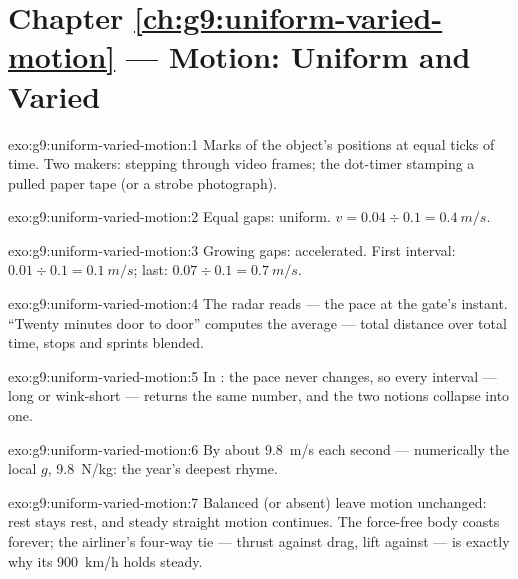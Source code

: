 \section*{Chapter \ref{ch:g9:uniform-varied-motion} --- Motion: Uniform and Varied}

\begin{solution}{exo:g9:uniform-varied-motion:1}
Marks of the object's positions at equal ticks of time. Two
makers: stepping through video frames; the dot-timer stamping
a pulled paper tape (or a strobe photograph).
\end{solution}

\begin{solution}{exo:g9:uniform-varied-motion:2}
Equal gaps: uniform. $v = 0.04 \div 0.1 = \qty{0.4}{m/s}$.
\end{solution}

\begin{solution}{exo:g9:uniform-varied-motion:3}
Growing gaps: accelerated. First interval: $0.01 \div 0.1 =
\qty{0.1}{m/s}$; last: $0.07 \div 0.1 = \qty{0.7}{m/s}$.
\end{solution}

\begin{solution}{exo:g9:uniform-varied-motion:4}
The radar reads  --- the pace at the gate's
instant. ``Twenty minutes door to door'' computes the average
--- total distance over total time, stops and sprints blended.
\end{solution}

\begin{solution}{exo:g9:uniform-varied-motion:5}
In : the pace never changes, so every interval
--- long or wink-short --- returns the same number, and the
two notions collapse into one.
\end{solution}

\begin{solution}{exo:g9:uniform-varied-motion:6}
By about \qty{9.8}{m/s} each second --- numerically the local
$g$, \qty{9.8}{N/kg}: the year's deepest rhyme.
\end{solution}

\begin{solution}{exo:g9:uniform-varied-motion:7}
Balanced (or absent)  leave motion unchanged: rest stays
rest, and steady straight motion continues. The force-free
body coasts forever; the airliner's four-way tie --- thrust
against drag, lift against  --- is exactly why its
\qty{900}{km/h} holds steady.
\end{solution}

